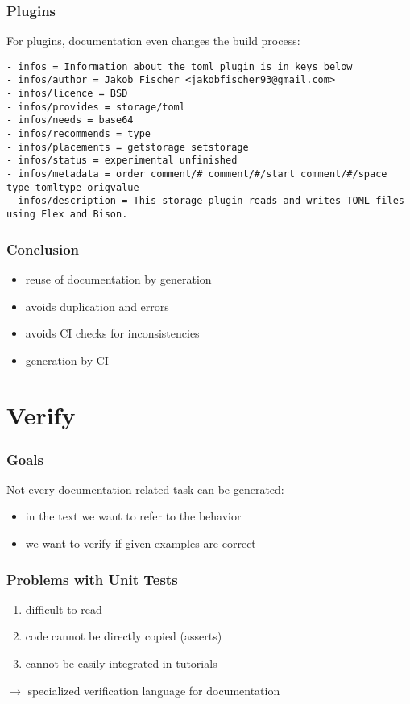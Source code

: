 \begin{frame}[fragile]
	\frametitle{Plugins}

	For plugins, documentation even changes the build process:
	\begin{lstlisting}[keywords={infos,author,license,provides,needs,recommends,placements,status,metadata}]
- infos = Information about the toml plugin is in keys below
- infos/author = Jakob Fischer <jakobfischer93@gmail.com>
- infos/licence = BSD
- infos/provides = storage/toml
- infos/needs = base64
- infos/recommends = type
- infos/placements = getstorage setstorage
- infos/status = experimental unfinished
- infos/metadata = order comment/# comment/#/start comment/#/space type tomltype origvalue
- infos/description = This storage plugin reads and writes TOML files using Flex and Bison.\end{lstlisting}
\end{frame}

\begin{frame}
	\frametitle{Conclusion}

	\begin{itemize}[<+-| alert@+>]
	\item reuse of documentation by generation
	\item avoids duplication and errors
	\item avoids CI checks for inconsistencies
	\item generation by CI
	\end{itemize}
\end{frame}

\section{Verify}

\begin{frame}
	\frametitle{Goals}

	Not every documentation-related task can be generated:

	\begin{itemize}[<+-| alert@+>]
	\item in the text we want to refer to the behavior
	\item we want to verify if given examples are correct
	\end{itemize}
\end{frame}

\begin{frame}
	\frametitle{Problems with Unit Tests}

	\begin{enumerate}[<+-| alert@+>]
	\item difficult to read
	\item code cannot be directly copied (asserts)
	\item cannot be easily integrated in tutorials
	\end{enumerate}

	\pause[\thebeamerpauses]  %

	$\rightarrow$ specialized verification language for documentation
\end{frame}

